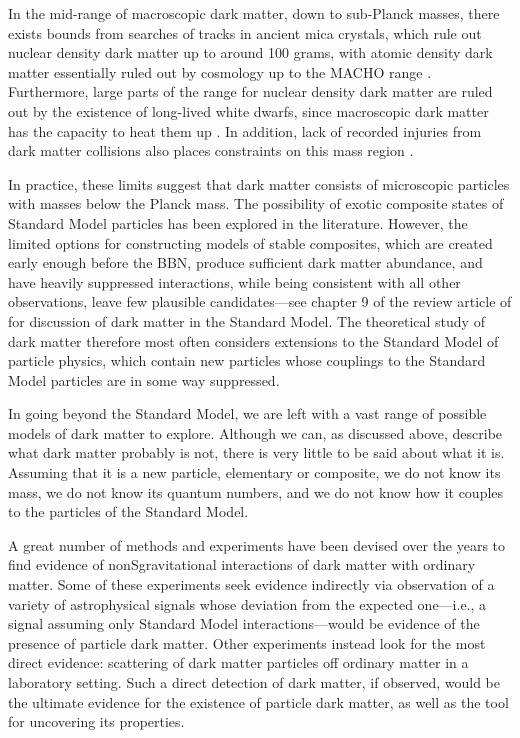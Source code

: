 In the mid-range of macroscopic dark matter, down to sub-Planck masses, there exists bounds from searches of tracks in ancient mica crystals, which rule out nuclear density dark matter up to around 100 grams, with atomic density dark matter essentially ruled out by cosmology up to the MACHO range \parencite{JacobsStarkmanLynn2015}. Furthermore, large parts of the range for nuclear density dark matter are ruled out by the existence of long-lived white dwarfs, since macroscopic dark matter has the capacity to heat them up \parencite{Graham2018}. In addition, lack of recorded injuries from dark matter collisions also places constraints on this mass region \parencite{SidhuScherrerStarkman2020}.

In practice, these limits suggest that dark matter consists of microscopic particles with masses below the Planck mass. The possibility of exotic composite states of Standard Model particles has been explored in the literature. However, the limited options for constructing models of stable composites, which are created early enough before the BBN, produce sufficient dark matter abundance, and have heavily suppressed interactions, while being consistent with all other observations, leave few plausible candidates---see chapter 9 of the review article of \textcite{CirelliStrumiaZupan2024} for discussion of dark matter in the Standard Model. The theoretical study of dark matter therefore most often considers extensions to the Standard Model of particle physics, which contain new particles whose couplings to the Standard Model particles are in some way suppressed.

In going beyond the Standard Model, we are left with a vast range of possible models of dark matter to explore. Although we can, as discussed above, describe what dark matter probably is not, there is very little to be said about what it is. Assuming that it is a new particle, elementary or composite, we do not know its mass, we do not know its quantum numbers, and we do not know how it couples to the particles of the Standard Model.

A great number of methods and experiments have been devised over the years to find evidence of nonSgravitational interactions of dark matter with ordinary matter. Some of these experiments seek evidence indirectly via observation of a variety of astrophysical signals whose deviation from the expected one---i.e., a signal assuming only Standard Model interactions---would be evidence of the presence of particle dark matter. Other experiments instead look for the most direct evidence: scattering of dark matter particles off ordinary matter in a laboratory setting. Such a direct detection of dark matter, if observed, would be the ultimate evidence for the existence of particle dark matter, as well as the tool for uncovering its properties.

